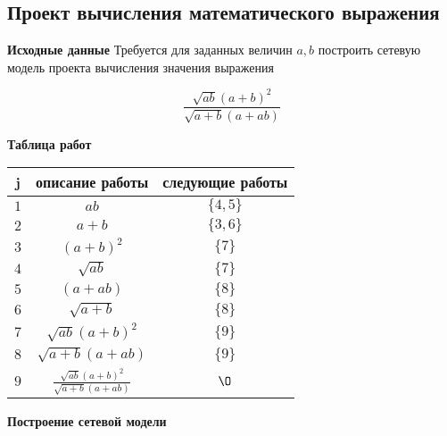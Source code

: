 \subsection{Проект вычисления математического выражения}

\label{proj:math_expr_calc_project}

\textbf{Исходные данные}
Требуется для заданных величин $a, b$ построить сетевую модель проекта вычисления значения выражения

\[\boxed{\frac{\sqrt{ab}(a + b)^2}{\sqrt{a + b}(a + ab)}}\]

\bigskip

\textbf{Таблица работ}

\begin{table}[H]
	\centering
	\begin{tabular}{ | c | c | c | } 
		\hline
		j & описание работы & следующие работы \\\hline
		$1$ & $ab$ & $\{4,5\}$ \\\hline
		$2$ & $a+b$ & $\{3, 6\}$ \\\hline
		$3$ & $(a+b)^2$ & $\{7\}$ \\\hline
		$4$ & $\sqrt{ab}$ & $\{7\}$ \\\hline
		$5$ & $(a+ab)$ & $\{8\}$ \\\hline
		$6$ & $\sqrt{a+b}$ & $\{8\}$ \\\hline
		$7$ & $\sqrt{ab}(a+b)^2$ & $\{9\}$ \\\hline
		$8$ & $\sqrt{a+b}(a+ab)$ & $\{9\}$ \\\hline
		$9$ & $\frac{\sqrt{ab}(a + b)^2}{\sqrt{a + b}(a + ab)}$ & $\O$ \\\hline
	\end{tabular}
\end{table}

\bigskip

\textbf{Построение сетевой модели}

